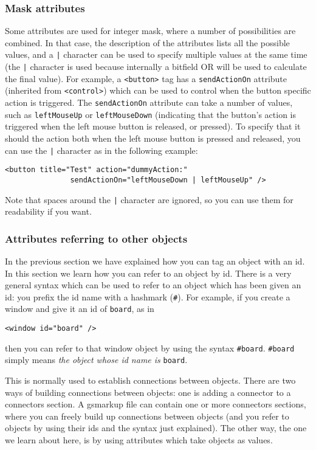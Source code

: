 \subsubsection{Mask attributes}
Some attributes are used for integer mask, where a number of
possibilities are combined.  In that case, the description of the
attributes lists all the possible values, and a \texttt{|} character
can be used to specify multiple values at the same time (the
\texttt{|} character is used because internally a bitfield OR will be
used to calculate the final value).  For example, a \texttt{<button>}
tag has a \texttt{sendActionOn} attribute (inherited from
\texttt{<control>}) which can be used to control when the button
specific action is triggered.  The \texttt{sendActionOn} attribute can
take a number of values, such as \texttt{leftMouseUp} or
\texttt{leftMouseDown} (indicating that the button's action is
triggered when the left mouse button is released, or pressed).  To
specify that it should the action both when the left mouse button is
pressed and released, you can use the \texttt{|} character as in the
following example:
\begin{verbatim}
<button title="Test" action="dummyAction:" 
               sendActionOn="leftMouseDown | leftMouseUp" />
\end{verbatim}
Note that spaces around the \texttt{|} character are ignored, so you
can use them for readability if you want.

\subsubsection{Attributes referring to other objects}
In the previous section we have explained how you can tag an object
with an id.  In this section we learn how you can refer to an object
by id.  There is a very general syntax which can be used to refer to
an object which has been given an id: you prefix the id name with a
hashmark (\texttt{\#}).  For example, if you create a window and give
it an id of \texttt{board}, as in
\begin{verbatim}
<window id="board" />
\end{verbatim}
then you can refer to that window object by using the syntax
\texttt{\#board}.  \texttt{\#board} simply means {\it the object whose id name 
is} \texttt{board}.

This is normally used to establish connections between objects.  There
are two ways of building connections between objects: one is adding a
connector to a connectors section.  A gsmarkup file can contain one or
more connectors sections, where you can freely build up connections
between objects (and you refer to objects by using their ids and the
syntax just explained).  The other way, the one we learn about here,
is by using attributes which take objects as values.

